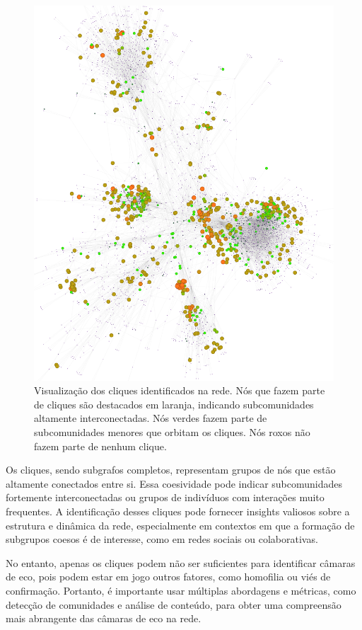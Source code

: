 \begin{figure}[!hbtp]
	\centering
	\includegraphics[scale=0.45]{images/colab-cliques.png}
	\caption{Visualização dos cliques identificados na rede. Nós que fazem parte de cliques são destacados em laranja, indicando subcomunidades altamente interconectadas. Nós verdes fazem parte de subcomunidades menores que orbitam os cliques. Nós roxos não fazem parte de nenhum clique.}
	\label{fig:gephi_cliques}
	\fautor
\end{figure}

Os cliques, sendo subgrafos completos, representam grupos de nós que estão altamente conectados entre si. Essa coesividade pode indicar subcomunidades fortemente interconectadas ou grupos de indivíduos com interações muito frequentes. A identificação desses cliques pode fornecer insights valiosos sobre a estrutura e dinâmica da rede, especialmente em contextos em que a formação de subgrupos coesos é de interesse, como em redes sociais ou colaborativas.

No entanto, apenas os cliques podem não ser suficientes para identificar câmaras de eco, pois podem estar em jogo outros fatores, como homofilia ou viés de confirmação. Portanto, é importante usar múltiplas abordagens e métricas, como detecção de comunidades e análise de conteúdo, para obter uma compreensão mais abrangente das câmaras de eco na rede.

